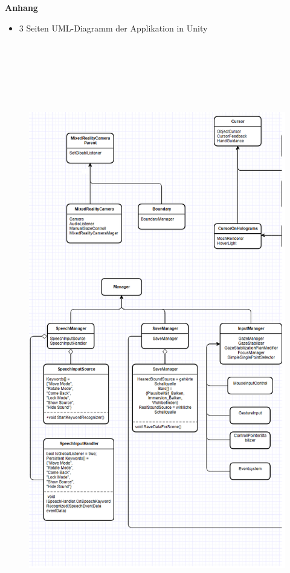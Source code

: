 \documentclass[a4paper,12pt]{scrreprt}
\begin{document}
\newpage
\huge{\textbf{Anhang}} \normalsize
\begin{itemize}
\item 3 Seiten UML-Diagramm der Applikation in Unity
\end{itemize}
\newpage
\pagestyle{empty}
\begin{figure}[H]
\centering
\includegraphics[width = 21cm, height = 26cm]{UML_1.png}
\end{figure} 
\end{document}
